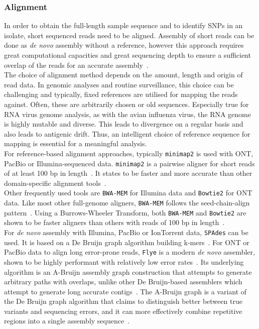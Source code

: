 \subsubsection*{Alignment}
In order to obtain the full-length sample sequence and to identify \acp{SNP} in an isolate, short sequenced reads need to be aligned. Assembly of short reads can be done as \textit{de novo} assembly without a reference, however this approach requires great computational capacities and great sequencing depth to ensure a sufficient overlap of the reads for an accurate assembly~\cite{ekblom2014field}. \\
The choice of alignment method depends on the amount, length and origin of read data. In genomic analyses and routine surveillance, this choice can be challenging and typically, fixed references are utilised for mapping the reads against. Often, these are arbitrarily chosen or old sequences. Especially true for RNA virus genome analysis, as with the avian influenza virus, the RNA genome is highly mutable and diverse. This leads to divergence on a regular basis and also leads to antigenic drift. Thus, an intelligent choice of reference sequence for mapping is essential for a meaningful analysis. \\
For reference-based alignment approaches, typically \texttt{minimap2} is used with \ac{ONT}, PacBio or Illumina-sequenced data. \texttt{minimap2} is a pairwise aligner for short reads of at least 100 bp in length~\cite{li2018minimap2}. It states to be faster and more accurate than other domain-specific alignment tools~\cite{li2018minimap2}. \\
Other frequently used tools are \texttt{BWA-MEM} for Illumina data and \texttt{Bowtie2} for \ac{ONT} data. Like most other full-genome aligners, \texttt{BWA-MEM} follows the seed-chain-align pattern~\cite{li2013aligning}. Using a Burrows-Wheeler Transform, both \texttt{BWA-MEM} and \texttt{Bowtie2} are shown to be faster aligners than others with reads of 100 bp in length~\cite{borozan2013evaluation}. \\
For \textit{de novo} assembly with Illumina, PacBio or IonTorrent data, \texttt{SPAdes} can be used. It is based on a De Bruijn graph algorithm building k-mers~\cite{bankevich2012spades}. For \ac{ONT} or PacBio data to align long error-prone reads, \texttt{Flye} is a modern \textit{de novo} assembler, shown to be highly performant with relatively low error rates~\cite{kolmogorov2019assembly, dida2021empirical}. Its underlying algorithm is an A-Bruijn assembly graph construction that attempts to generate arbitrary paths with overlaps, unlike other De Bruijn-based assemblers which attempt to generate long accurate contigs~\cite{kolmogorov2019assembly}. The A-Bruijn graph is a variant of the De Bruijn graph algorithm that claims to distinguish better between true variants and sequencing errors, and it can more effectively combine repetitive regions into a single assembly sequence~\cite{kolmogorov2019assembly}.

